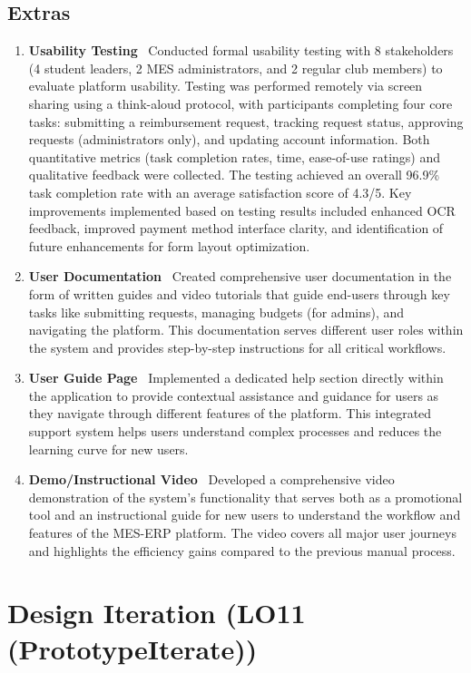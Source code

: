 \documentclass{article}
\begin{document}
\subsection{Extras}
\begin{enumerate}
\item \textbf{Usability Testing} \
Conducted formal usability testing with 8 stakeholders (4 student leaders, 2 MES administrators, and 2 regular club members) to evaluate platform usability. Testing was performed remotely via screen sharing using a think-aloud protocol, with participants completing four core tasks: submitting a reimbursement request, tracking request status, approving requests (administrators only), and updating account information. Both quantitative metrics (task completion rates, time, ease-of-use ratings) and qualitative feedback were collected. The testing achieved an overall 96.9\% task completion rate with an average satisfaction score of 4.3/5. Key improvements implemented based on testing results included enhanced OCR feedback, improved payment method interface clarity, and identification of future enhancements for form layout optimization.
\item \textbf{User Documentation} \
Created comprehensive user documentation in the form of written guides and video tutorials that guide end-users through key tasks like submitting requests, managing budgets (for admins), and navigating the platform. This documentation serves different user roles within the system and provides step-by-step instructions for all critical workflows.
\item \textbf{User Guide Page} \
Implemented a dedicated help section directly within the application to provide contextual assistance and guidance for users as they navigate through different features of the platform. This integrated support system helps users understand complex processes and reduces the learning curve for new users.
\item \textbf{Demo/Instructional Video} \
Developed a comprehensive video demonstration of the system's functionality that serves both as a promotional tool and an instructional guide for new users to understand the workflow and features of the MES-ERP platform. The video covers all major user journeys and highlights the efficiency gains compared to the previous manual process.
\end{enumerate}

\section{Design Iteration (LO11 (PrototypeIterate))}
\end{document}
